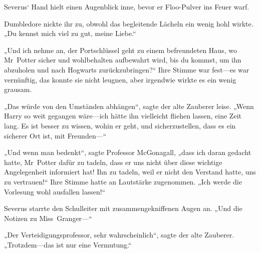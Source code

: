 Severus‘ Hand hielt einen Augenblick inne, bevor er Floo-Pulver ins Feuer warf.

Dumbledore nickte ihr zu, obwohl das begleitende Lächeln ein wenig hohl wirkte. „Du kennst mich viel zu gut, meine Liebe.“

„Und ich nehme an, der Portschlüssel geht zu einem befreundeten Haus, wo Mr~Potter sicher und wohlbehalten aufbewahrt wird, bis du kommst, um ihn abzuholen und nach Hogwarts zurückzubringen?“
Ihre Stimme war fest—es war vernünftig, das konnte sie nicht leugnen, aber irgendwie wirkte es ein wenig grausam.

„Das würde von den Umständen abhängen“, sagte der alte Zauberer leise. „Wenn Harry so weit gegangen wäre—ich hätte ihn vielleicht fliehen lassen, eine Zeit lang. Es ist besser zu wissen, wohin er geht, und sicherzustellen, dass es ein sicherer Ort ist, mit Freunden—“

„Und wenn man bedenkt“, sagte Professor McGonagall, „dass ich daran gedacht hatte, Mr~Potter dafür zu tadeln, dass er uns nicht über diese wichtige Angelegenheit informiert hat! Ihn zu tadeln, weil er nicht den Verstand hatte, uns zu vertrauen!“
Ihre Stimme hatte an Lautstärke zugenommen.
„Ich werde die Vorlesung wohl ausfallen lassen!“

Severus starrte den Schulleiter mit zusammengekniffenen Augen an. „Und die Notizen zu Miss~Granger—“

„Der Verteidigungsprofessor, sehr wahrscheinlich“, sagte der alte Zauberer. „Trotzdem—das ist nur eine Vermutung.“

